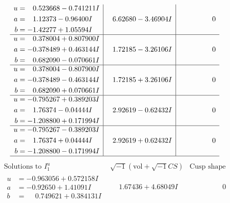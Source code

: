 \documentclass[1p]{elsarticle_modified}
\theoremstyle{definition}
\newcommand{\I}{\sqrt{-1}}
\begin{document}
$$\begin{array}{c|c|c}
\begin{aligned}
u &= \phantom{-}0.523668 - 0.741211 I \\
a &= \phantom{-}1.12373 - 0.96400 I \\
b &= -1.42277 + 1.05594 I\end{aligned}
 & \phantom{-}6.62680 - 3.46904 I & \phantom{-0.000000 } 0 \\ \hline\begin{aligned}
u &= \phantom{-}0.378004 + 0.807900 I \\
a &= -0.378489 + 0.463144 I \\
b &= \phantom{-}0.682090 - 0.070661 I\end{aligned}
 & \phantom{-}1.72185 - 3.26106 I & \phantom{-0.000000 } 0 \\ \hline\begin{aligned}
u &= \phantom{-}0.378004 - 0.807900 I \\
a &= -0.378489 - 0.463144 I \\
b &= \phantom{-}0.682090 + 0.070661 I\end{aligned}
 & \phantom{-}1.72185 + 3.26106 I & \phantom{-0.000000 } 0 \\ \hline\begin{aligned}
u &= -0.795267 + 0.389203 I \\
a &= \phantom{-}1.76374 - 0.04444 I \\
b &= -1.208800 + 0.171994 I\end{aligned}
 & \phantom{-}2.92619 - 0.62432 I & \phantom{-0.000000 } 0 \\ \hline\begin{aligned}
u &= -0.795267 - 0.389203 I \\
a &= \phantom{-}1.76374 + 0.04444 I \\
b &= -1.208800 - 0.171994 I\end{aligned}
 & \phantom{-}2.92619 + 0.62432 I & \phantom{-0.000000 } 0\\
 \hline 
 \end{array}$$\newpage$$\begin{array}{c|c|c}  
\text{Solutions to }I^u_{1}& \I (\text{vol} + \sqrt{-1}CS) & \text{Cusp shape}\\
 \hline 
\begin{aligned}
u &= -0.963056 + 0.572158 I \\
a &= -0.92650 + 1.41091 I \\
b &= \phantom{-}0.749621 + 0.384131 I\end{aligned}
 & \phantom{-}1.67436 + 4.68049 I & \phantom{-0.000000 } 0 \\ \hline\begin{aligned}

\end{aligned}
\end{array}$$
\end{document}
